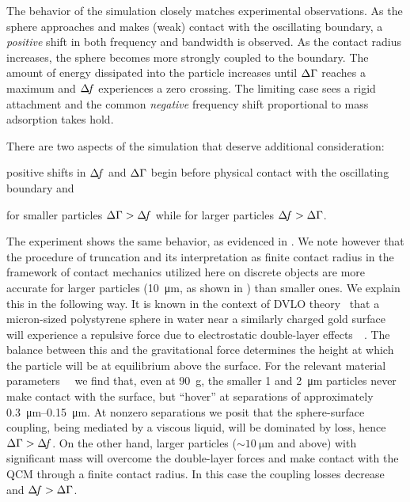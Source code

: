 The behavior of the simulation closely matches
experimental observations.  As the sphere approaches and makes (weak)
contact with the oscillating boundary, a \textit{positive} shift in both
frequency and bandwidth is observed.  As the contact radius increases, the
sphere becomes more strongly coupled to the boundary. The amount of energy
dissipated into the particle increases until $\Delta\Gamma$ reaches a maximum and
$\Delta\!f$ experiences a zero crossing.  The limiting case sees a rigid
attachment and the common \textit{negative} frequency shift proportional to
mass adsorption takes hold.  

There are two aspects of the simulation that deserve additional
consideration:%
\begin{inparaenum}[(1)]
\item positive shifts in $\Delta\!f$ and $\Delta\Gamma$ begin 
before physical contact with the oscillating boundary and 
\item for smaller particles $\Delta\Gamma>\Delta\!f$ while for
larger particles $\Delta\!f>\Delta\Gamma$.
\end{inparaenum}
The experiment shows the same behavior, as evidenced in
.  We note however that the procedure of truncation
and its interpretation as finite contact radius in the framework of contact
mechanics utilized here on discrete objects are more accurate for larger
particles (\SI{10}{\micro\meter}, as shown in )
than smaller ones.  We explain this in the following way.
It is known in
the context of DVLO theory~\cite{israelachvili2011intermolecular} that a
micron-sized polystyrene sphere in water near a similarly charged gold
surface will experience a repulsive force due to electrostatic double-layer
effects~\cite{alexander1987hydrodynamic}~\cite{flicker1993quantifying}.
The balance between this and the gravitational force determines the height
at which the particle will be at equilibrium above the surface.  For the
relevant material
parameters~\cite{israelachvili2011intermolecular}~\cite{sharma1992factors}
we find that, even at \SI{90}{g}, the smaller \num{1} and
\SI{2}{\micro\meter} particles never make contact with the surface, but
``hover'' at separations of approximately
\SIrange{0.3}{0.15}{\micro\meter}.  At nonzero separations we posit that
the sphere-surface coupling, being mediated by a viscous liquid, will be
dominated by loss, hence $\Delta\Gamma>\Delta\!f$.  On the other hand, larger particles
($\sim\SI{10}{\micro\meter}$ and above) with significant mass will overcome
the double-layer forces and make contact with the QCM through a finite
contact radius.  In this case the coupling losses decrease and $\Delta\!f>\Delta\Gamma$.

